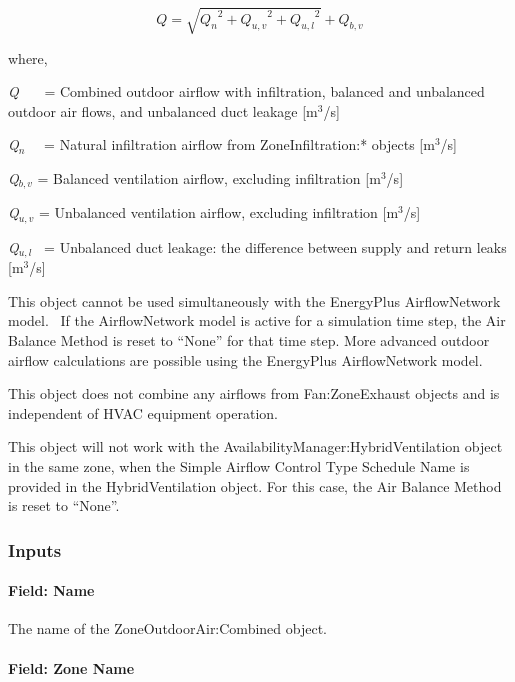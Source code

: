\begin{equation}
Q = \sqrt {{Q_n}^2 + {Q_{u,v}}^2 + {Q_{u,l}}^2}  + {Q_{b,v}}
\end{equation}

where,

\emph{Q}~~~ = Combined outdoor airflow with infiltration, balanced and unbalanced outdoor air flows, and unbalanced duct leakage {[}m\(^{3}\)/s{]}

\emph{Q\(_{n}\)}~~ = Natural infiltration airflow from ZoneInfiltration:* objects {[}m\(^{3}\)/s{]}

\emph{Q\(_{b,v}\)} = Balanced ventilation airflow, excluding infiltration {[}m\(^{3}\)/s{]}

\emph{Q\(_{u,v}\)} = Unbalanced ventilation airflow, excluding infiltration {[}m\(^{3}\)/s{]}

\emph{Q\(_{u,l}\)}~ = Unbalanced duct leakage: the difference between supply and return leaks {[}m\(^{3}\)/s{]}

This object cannot be used simultaneously with the EnergyPlus AirflowNetwork model.~ If the AirflowNetwork model is active for a simulation time step, the Air Balance Method is reset to ``None'' for that time step. More advanced outdoor airflow calculations are possible using the EnergyPlus AirflowNetwork model.

This object does not combine any airflows from Fan:ZoneExhaust objects and is independent of HVAC equipment operation.

This object will not work with the AvailabilityManager:HybridVentilation object in the same zone, when the Simple Airflow Control Type Schedule Name is provided in the HybridVentilation object. For this case, the Air Balance Method is reset to ``None''.

\subsubsection{Inputs}\label{inputs-4-004}

\paragraph{Field: Name}\label{field-name-4-004}

The name of the ZoneOutdoorAir:Combined object.

\paragraph{Field: Zone Name}\label{field-zone-name-2}

